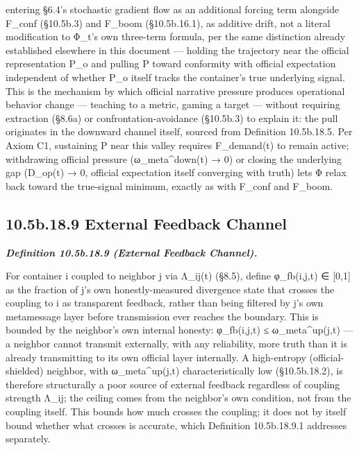 \documentclass[
]{article}
\begin{document}
entering §6.4's stochastic gradient flow as an additional forcing term
alongside F\_conf (§10.5b.3) and F\_boom (§10.5b.16.1), as additive
drift, not a literal modification to Φ\_t's own three-term formula, per
the same distinction already established elsewhere in this document ---
holding the trajectory near the official representation P\_o and pulling
P toward conformity with official expectation independent of whether
P\_o itself tracks the container's true underlying signal. This is the
mechanism by which official narrative pressure produces operational
behavior change --- teaching to a metric, gaming a target --- without
requiring extraction (§8.6a) or confrontation-avoidance (§10.5b.3) to
explain it: the pull originates in the downward channel itself, sourced
from Definition 10.5b.18.5. Per Axiom C1, sustaining P near this valley
requires F\_demand(t) to remain active; withdrawing official pressure
(ω\_meta\^{}down(t) → 0) or closing the underlying gap (D\_op(t) → 0,
official expectation itself converging with truth) lets Φ relax back
toward the true-signal minimum, exactly as with F\_conf and F\_boom.

\hypertarget{b.18.9-external-feedback-channel}{%
\subsection{10.5b.18.9 External Feedback
Channel}\label{b.18.9-external-feedback-channel}}

\emph{\textbf{Definition 10.5b.18.9 (External Feedback Channel).}}

For container i coupled to neighbor j via Λ\_ij(t) (§8.5), define
φ\_fb(i,j,t) ∈ {[}0,1{]} as the fraction of j's own honestly-measured
divergence state that crosses the coupling to i as transparent feedback,
rather than being filtered by j's own metamessage layer before
transmission ever reaches the boundary. This is bounded by the
neighbor's own internal honesty: φ\_fb(i,j,t) ≤ ω\_meta\^{}up(j,t) --- a
neighbor cannot transmit externally, with any reliability, more truth
than it is already transmitting to its own official layer internally. A
high-entropy (official-shielded) neighbor, with ω\_meta\^{}up(j,t)
characteristically low (§10.5b.18.2), is therefore structurally a poor
source of external feedback regardless of coupling strength Λ\_ij; the
ceiling comes from the neighbor's own condition, not from the coupling
itself. This bounds how much crosses the coupling; it does not by itself
bound whether what crosses is accurate, which Definition 10.5b.18.9.1
addresses separately.
\end{document}
